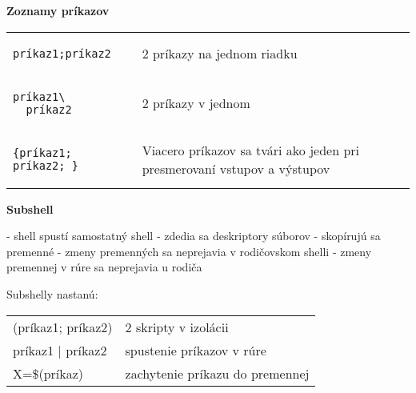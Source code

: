 \documentclass[8pt,landscape]{extarticle}
\newcommand{\Heading}[1]{%
{\begin{center}\bfseries\Large#1\end{center}}%
}%
\newenvironment{karticka}[1]%
{%
\Heading{#1}%
}%
{%
\clearpage
}%
\begin{document}
\begin{karticka}{Zoznamy príkazov}
\begin{table}[h!]
\begin{tabular}{p{3.3cm}|p{5cm}}
\begin{tcolorbox}[sharp corners,left=0mm,right=0mm,leftrule=0mm,rightrule=0mm,toprule=0mm,bottomrule=0mm,enlarge bottom by=-5mm]
\begin{Verbatim}
príkaz1;príkaz2
\end{Verbatim}
\end{tcolorbox}
&
2 príkazy na jednom riadku
\\
\begin{tcolorbox}[sharp corners,left=0mm,right=0mm,leftrule=0mm,rightrule=0mm,toprule=0mm,bottomrule=0mm,enlarge bottom by=-5mm]
\begin{Verbatim}
príkaz1\
  príkaz2
\end{Verbatim}
\end{tcolorbox}
& 2 príkazy v jednom
\\
\begin{tcolorbox}[sharp corners,left=0mm,right=0mm,leftrule=0mm,rightrule=0mm,toprule=0mm,bottomrule=0mm,enlarge bottom by=-5mm]
\begin{Verbatim}
{príkaz1; príkaz2; }
\end{Verbatim}
\end{tcolorbox}
&
Viacero príkazov  
sa tvári ako  
jeden pri 
presmerovaní  
vstupov 
a výstupov
\end{tabular}
\end{table}


\end{karticka}
\begin{karticka}{Subshell}
\begin{obsah}
- shell spustí samostatný shell
- zdedia sa deskriptory súborov
- skopírujú sa premenné
  - zmeny premenných sa neprejavia v rodičovskom shelli
  - zmeny premennej v rúre sa neprejavia u rodiča
\end{obsah}

Subshelly nastanú:\par\vspace{1em}

\begin{tabular}{ll}
(príkaz1; príkaz2) & 2 skripty v izolácii
\\
príkaz1 | príkaz2 & spustenie príkazov v rúre\\
X=\$(príkaz) & zachytenie príkazu do premennej
\end{tabular}
\end{karticka}
\end{document}
